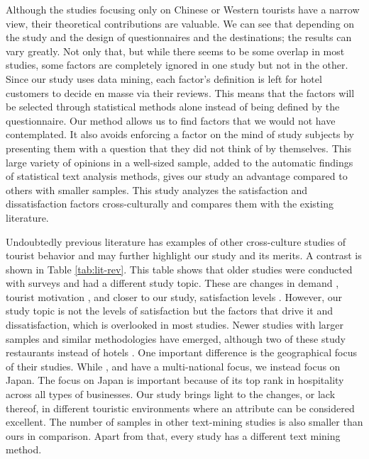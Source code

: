 \documentclass[smallextended,natbib]{svjour3}       %
\begin{document}
    Although the studies focusing only on Chinese or Western tourists have a narrow view, their theoretical contributions are valuable. We can see that depending on the study and the design of questionnaires and the destinations; the results can vary greatly. Not only that, but while there seems to be some overlap in most studies, some factors are completely ignored in one study but not in the other. Since our study uses data mining, each factor's definition is left for hotel customers to decide en masse via their reviews. This means that the factors will be selected through statistical methods alone instead of being defined by the questionnaire. Our method allows us to find factors that we would not have contemplated. It also avoids enforcing a factor on the mind of study subjects by presenting them with a question that they did not think of by themselves. This large variety of opinions in a well-sized sample, added to the automatic findings of statistical text analysis methods, gives our study an advantage compared to others with smaller samples. This study analyzes the satisfaction and dissatisfaction factors cross-culturally and compares them with the existing literature.

    Undoubtedly previous literature has examples of other cross-culture studies of tourist behavior and may further highlight our study and its merits. A contrast is shown in Table \ref{tab:lit-rev}. This table shows that older studies were conducted with surveys and had a different study topic. These are changes in demand \cite[][]{bauer1993changing}, tourist motivation \cite[][]{kim2000}, and closer to our study, satisfaction levels \cite[][]{choi2000}. However, our study topic is not the levels of satisfaction but the factors that drive it and dissatisfaction, which is overlooked in most studies. Newer studies with larger samples and similar methodologies have emerged, although two of these study restaurants instead of hotels \cite[][]{JIA2020104071, HUANG2017117}. One important difference is the geographical focus of their studies. While \cite{FRANCESCO201924} , \cite{JIA2020104071} and \cite{HUANG2017117} have a multi-national focus, we instead focus on Japan. The focus on Japan is important because of its top rank in hospitality across all types of businesses. Our study brings light to the changes, or lack thereof, in different touristic environments where an attribute can be considered excellent. The number of samples in other text-mining studies is also smaller than ours in comparison. Apart from that, every study has a different text mining method.
\end{document}

